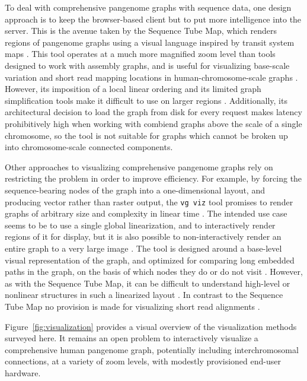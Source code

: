 To deal with comprehensive pangenome graphs with sequence data, one design approach is to keep the browser-based client but to put more intelligence into the server.
This is the avenue taken by the Sequence Tube Map, which renders regions of pangenome graphs using a visual language inspired by transit system maps \citep{Beyer_2019}.
This tool operates at a much more magnified zoom level than tools designed to work with assembly graphs, and is useful for visualizing base-scale variation and short read mapping locations in human-chromosome-scale graphs \citep{Beyer_2019}.
However, its imposition of a local linear ordering and its limited graph simplification tools make it difficult to use on larger regions \citep{Beyer_2019}.
Additionally, its architectural decision to load the graph from disk for every request makes latency prohibitively high when working with combiend graphs above the scale of a single chromosome, so the tool is not suitable for graphs which cannot be broken up into chromosome-scale connected components.

Other approaches to visualizing comprehensive pangenome graphs rely on restricting the problem in order to improve efficiency.
For example, by forcing the sequence-bearing nodes of the graph into a one-dimensional layout, and producing vector rather than raster output, the \texttt{vg viz} tool promises to render graphs of arbitrary size and complexity in linear time \citep{Garrison_2019}. The intended use case seems to be to use a single global linearization, and to interactively render regions of it for display, but it is also possible to non-interactively render an entire graph to a very large image \citep{Garrison_2019}. The tool is designed around a base-level visual representation of the graph, and optimized for comparing long embedded paths in the graph, on the basis of which nodes they do or do not visit \citep{Garrison_2019}. However, as with the Sequence Tube Map, it can be difficult to understand high-level or nonlinear structures in such a linearized layout \citep{Garrison_2019}. In contrast to the Sequence Tube Map no provision is made for visualizing short read alignments \citep{Garrison_2019}.

Figure~\ref{fig:visualization} provides a visual overview of the visualization methods surveyed here. It remains an open problem to interactively visualize a comprehensive human pangenome graph, potentially including interchromosomal connections, at a variety of zoom levels, with modestly provisioned end-user hardware.

